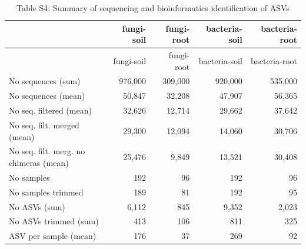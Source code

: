 \documentclass[11pt,]{article}
\begin{document}
\begin{longtable}[]{@{}lrrrr@{}}
\caption{Table S4: Summary of sequencing and bioinformatics
identification of ASVs}\tabularnewline
\toprule
& fungi-soil & fungi-root & bacteria-soil & bacteria-root\tabularnewline
\midrule
\endfirsthead
\toprule
& fungi-soil & fungi-root & bacteria-soil & bacteria-root\tabularnewline
\midrule
\endhead
No sequences (sum) & 976,000 & 309,000 & 920,000 &
535,000\tabularnewline
No sequences (mean) & 50,847 & 32,208 & 47,907 & 56,365\tabularnewline
No seq. filtered (mean) & 32,626 & 12,714 & 29,662 &
37,642\tabularnewline
No seq. filt. merged (mean) & 29,300 & 12,094 & 14,060 &
30,706\tabularnewline
No seq. filt. merg. no chimeras (mean) & 25,476 & 9,849 & 13,521 &
30,408\tabularnewline
No samples & 192 & 96 & 192 & 96\tabularnewline
No samples trimmed & 189 & 81 & 192 & 95\tabularnewline
No ASVs (sum) & 6,112 & 845 & 9,352 & 2,023\tabularnewline
No ASVs trimmed (sum) & 413 & 106 & 811 & 325\tabularnewline
ASV per sample (mean) & 176 & 37 & 269 & 92\tabularnewline
\bottomrule
\end{longtable}
\end{document}
